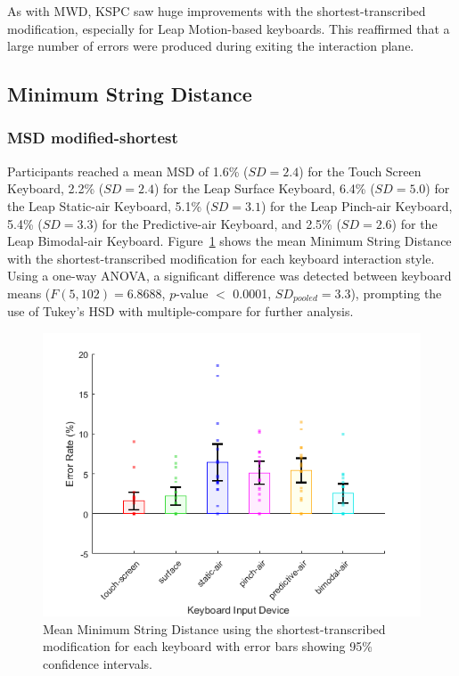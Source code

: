 As with MWD, KSPC saw huge improvements with the shortest-transcribed modification, especially for Leap Motion-based keyboards. This reaffirmed that a large number of errors were produced during exiting the interaction plane.

\subsection{Minimum String Distance}

\subsubsection{MSD modified-shortest}
Participants reached a mean MSD of 1.6\% ($SD = 2.4$) for the Touch Screen Keyboard, 2.2\% ($SD = 2.4$) for the Leap Surface Keyboard, 6.4\% ($SD = 5.0$) for the Leap Static-air Keyboard, 5.1\% ($SD = 3.1$) for the Leap Pinch-air Keyboard, 5.4\% ($SD = 3.3$) for the Predictive-air Keyboard, and 2.5\% ($SD = 2.6$) for the Leap Bimodal-air Keyboard. Figure~\ref{fig_MSD_short_mean} shows the mean Minimum String Distance with the shortest-transcribed modification for each keyboard interaction style. Using a one-way ANOVA, a significant difference was detected between keyboard means ($F(5, 102) = 6.8688$, $p$-value $<$ 0.0001, $SD_{pooled} = 3.3$), prompting the use of Tukey's HSD with multiple-compare for further analysis.

\begin{figure}[!t]
	\centering
	\includegraphics{Figures/fig_MSD_short_mean}
	\caption[Mean Minimum String Distance for Modified-shortest]{Mean Minimum String Distance using the shortest-transcribed modification for each keyboard with error bars showing 95\% confidence intervals.}
	\label{fig_MSD_short_mean}
\end{figure}

